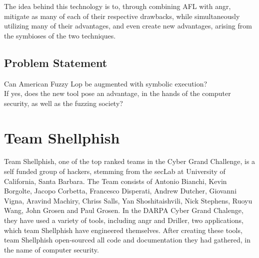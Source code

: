 \documentclass[a4paper]{article}
\begin{document}
The idea behind this technology is to, through combining AFL with angr, mitigate as many of each of their respective drawbacks, while simultaneously utilizing many of their advantages, and even create new advantages, arising from the symbioses of the two techniques.
\subsection{Problem Statement}
\label{sec:Problem}
Can American Fuzzy Lop be augmented with symbolic execution?\\[0.1cm]
If yes, does the new tool pose an advantage, in the hands of the computer security, as well as the fuzzing society?
\newpage
\section{Team Shellphish}
\label{sec:Shellphish}
Team Shellphish, one of the top ranked teams in the Cyber Grand Challenge, is a self funded group of hackers, stemming from the secLab at University of California, Santa Barbara. The Team consists of Antonio Bianchi, Kevin Borgolte, Jacopo Corbetta, Francesco Disperati, Andrew Dutcher, Giovanni Vigna, Aravind Machiry, Chriss Salls, Yan Shoshitaishvili, Nick Stephens, Ruoyu Wang, John Grosen and Paul Grosen. In the DARPA Cyber Grand Chalenge, they have used a variety of tools, including angr and Driller, two applications, which team Shellphish have engineered themselves. After creating these tools, team Shellphish open-sourced all code and documentation they had gathered, in the name of computer security.
\end{document}
